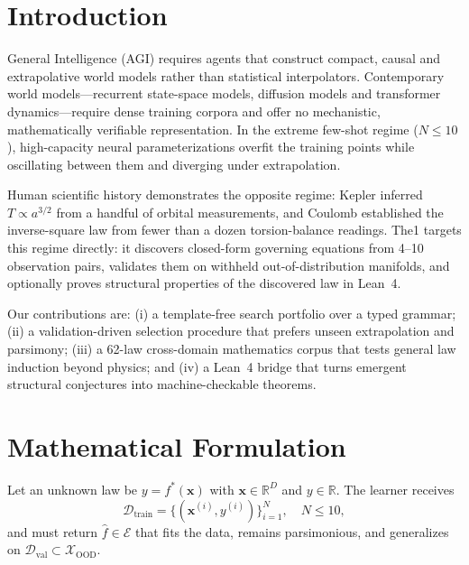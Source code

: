 \documentclass[10pt,journal,compsoc]{IEEEtran}
\begin{document}
\maketitle

\section{Introduction}
 General Intelligence (AGI) requires agents that construct compact, causal and extrapolative world models rather than statistical interpolators. Contemporary world models---recurrent state-space models, diffusion models and transformer dynamics---require dense training corpora and offer no mechanistic, mathematically verifiable representation. In the extreme few-shot regime ($N \le 10$), high-capacity neural parameterizations overfit the training points while oscillating between them and diverging under extrapolation.

Human scientific history demonstrates the opposite regime: Kepler inferred $T \propto a^{3/2}$ from a handful of orbital measurements, and Coulomb established the inverse-square law from fewer than a dozen torsion-balance readings. The1 targets this regime directly: it discovers closed-form governing equations from 4--10 observation pairs, validates them on withheld out-of-distribution manifolds, and optionally proves structural properties of the discovered law in Lean~4.

Our contributions are: (i) a template-free search portfolio over a typed grammar; (ii) a validation-driven selection procedure that prefers unseen extrapolation and parsimony; (iii) a 62-law cross-domain mathematics corpus that tests general law induction beyond physics; and (iv) a Lean~4 bridge that turns emergent structural conjectures into machine-checkable theorems.

\section{Mathematical Formulation}
Let an unknown law be $y = f^*(\mathbf{x})$ with $\mathbf{x} \in \mathbb{R}^D$ and $y \in \mathbb{R}$. The learner receives
\begin{equation}
\mathcal{D}_{\text{train}} = \{(\mathbf{x}^{(i)}, y^{(i)})\}_{i=1}^N, \quad N \le 10,
\end{equation}
and must return $\hat{f} \in \mathcal{E}$ that fits the data, remains parsimonious, and generalizes on $\mathcal{D}_{\text{val}} \subset \mathcal{X}_{\text{OOD}}$.
\end{document}

